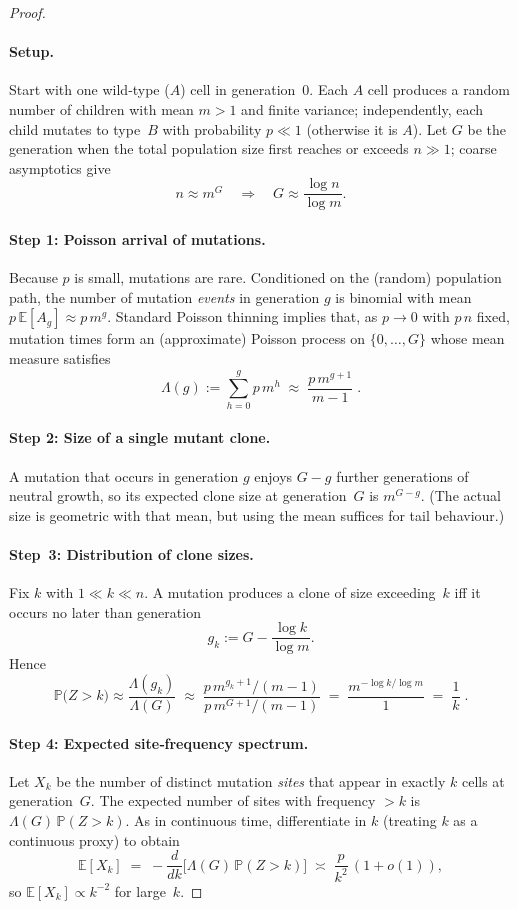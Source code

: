 \documentclass[11pt]{article}
\begin{document}
\begin{proof}

\paragraph{Setup.}
Start with one wild‑type ($A$) cell in generation $0$.  
Each $A$ cell produces a random number of children with mean $m>1$ and finite variance; independently, each child mutates to type $B$ with probability $p\ll1$ (otherwise it is $A$).  
Let $G$ be the generation when the total population size first reaches or exceeds $n\gg1$; coarse asymptotics give
\[
n\approx m^{G}\quad\Longrightarrow\quad G\approx\frac{\log n}{\log m}.
\]


\paragraph{Step 1: Poisson arrival of mutations.}
Because $p$ is small, mutations are rare.  
Conditioned on the (random) population path, the number of mutation \emph{events} in generation $g$ is binomial with mean $p\,\mathbb{E}[A_g]\approx p\,m^{g}$.  
Standard Poisson thinning implies that, as $p\to0$ with $p\,n$ fixed, mutation times form an (approximate) Poisson process on $\{0,\dots ,G\}$ whose mean measure satisfies
\[
\Lambda(g):=\sum_{h=0}^{g} p\,m^{h}\;\approx\;\frac{p\,m^{g+1}}{m-1}\; .
\]


\paragraph{Step 2: Size of a single mutant clone.}
A mutation that occurs in generation $g$ enjoys $G-g$ further generations of neutral growth, so its expected clone size at generation $G$ is $m^{G-g}$.  
(The actual size is geometric with that mean, but using the mean suffices for tail behaviour.)

\paragraph{Step 3: Distribution of clone sizes.}
Fix $k$ with $1\ll k\ll n$.  
A mutation produces a clone of size exceeding $k$ iff it occurs no later than generation
\[
g_k:=G-\frac{\log k}{\log m}.
\]
Hence
\[
\mathbb{P}\!\bigl(Z>k\bigr)
   \approx\frac{\Lambda(g_k)}{\Lambda(G)}
   \;\approx\;
   \frac{p\,m^{g_k+1}/(m-1)}{p\,m^{G+1}/(m-1)}
   \;=\;\frac{m^{-\log k/\log m}}{1}
   \;=\;\frac{1}{k}\; .
\]


\paragraph{Step 4: Expected site‑frequency spectrum.}
Let $X_k$ be the number of distinct mutation \emph{sites} that appear in exactly $k$ cells at generation $G$.  
The expected number of sites with frequency $>k$ is $\Lambda(G)\,\mathbb{P}(Z>k)$.  
As in continuous time, differentiate in $k$ (treating $k$ as a continuous proxy) to obtain
\[
\mathbb{E}[X_k]
   \;=\; -\frac{d}{dk}\bigl[\Lambda(G)\,\mathbb{P}(Z>k)\bigr]
   \;\asymp\; \frac{p}{k^{2}}\,(1+o(1)),
\]
so $\mathbb{E}[X_k]\propto k^{-2}$ for large~$k$.
\end{proof}
\end{document}

